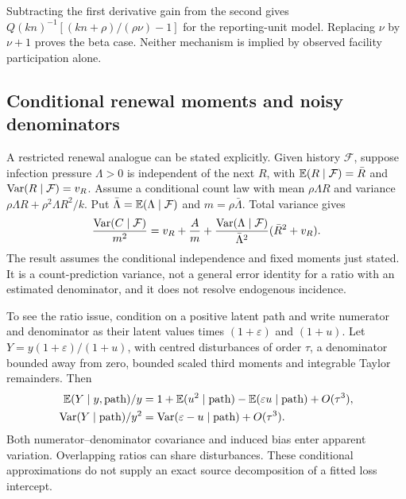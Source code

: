 Subtracting the first derivative gain from the second gives $Q(kn)^{-1}[(kn+\rho)/(\rho\nu)-1]$ for the reporting-unit model. Replacing $\nu$ by $\nu+1$ proves the beta case. Neither mechanism is implied by observed facility participation alone.

\subsection{Conditional renewal moments and noisy denominators}
\label{app:renewal}
\label{app:random-denominator}

A restricted renewal analogue can be stated explicitly. Given history $\mathcal F$, suppose infection pressure $\Lambda>0$ is independent of the next $R$, with $\mathbb{E}(R\mid\mathcal F)=\bar R$ and $\mathrm{Var}(R\mid\mathcal F)=v_R$. Assume a conditional count law with mean $\rho\Lambda R$ and variance $\rho\Lambda R+\rho^2\Lambda R^2/k$. Put $\bar\Lambda=\mathbb{E}(\Lambda\mid\mathcal F)$ and $m=\rho\bar\Lambda$. Total variance gives
\begin{equation}
 \frac{\mathrm{Var}(C\mid\mathcal F)}{m^2}
 =v_R+\frac{A}{m}
   +\frac{\mathrm{Var}(\Lambda\mid\mathcal F)}{\bar\Lambda^2}(\bar R^2+v_R).
 \label{eq:renewal-conditional}
\end{equation}
The result assumes the conditional independence and fixed moments just stated. It is a count-prediction variance, not a general error identity for a ratio with an estimated denominator, and it does not resolve endogenous incidence.

To see the ratio issue, condition on a positive latent path and write numerator and denominator as their latent values times $(1+\varepsilon)$ and $(1+u)$. Let $Y=y(1+\varepsilon)/(1+u)$, with centred disturbances of order $\tau$, a denominator bounded away from zero, bounded scaled third moments and integrable Taylor remainders. Then
\begin{equation}
\begin{aligned}
 \mathbb{E}(Y\mid y,\text{path})/y
 &=1+\mathbb{E}(u^2\mid\text{path})-\mathbb{E}(\varepsilon u\mid\text{path})+O(\tau^3),\\
 \mathrm{Var}(Y\mid\text{path})/y^2
 &=\mathrm{Var}(\varepsilon-u\mid\text{path})+O(\tau^3).
\end{aligned}
\end{equation}
Both numerator--denominator covariance and induced bias enter apparent variation. Overlapping ratios can share disturbances. These conditional approximations do not supply an exact source decomposition of a fitted loss intercept.

